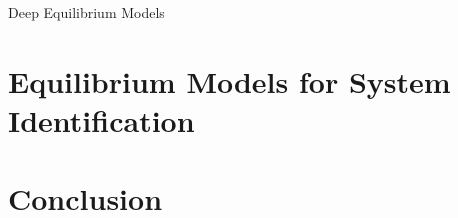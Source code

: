 \documentclass[8pt, t,
aspectratio=169,%
]{beamer}
\begin{document}
\begin{frame}{Deep Equilibrium Models}
    
\end{frame}

\section{Equilibrium Models for System Identification}

\section{Conclusion}
\end{document}
